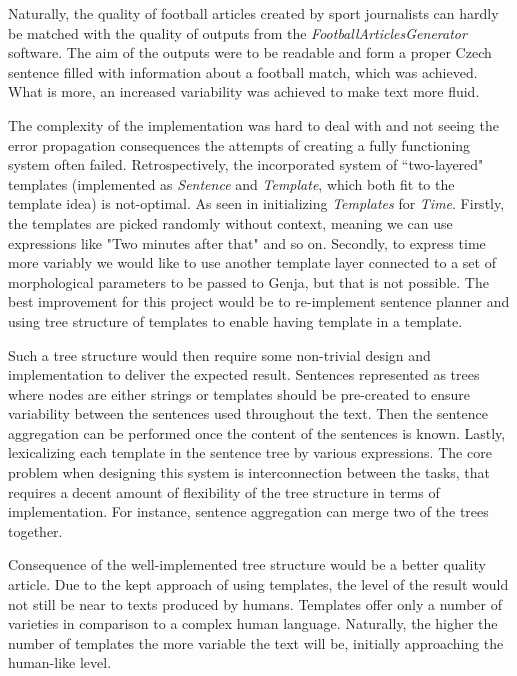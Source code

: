Naturally, the quality of football articles created by sport journalists can hardly be matched with the quality of outputs from the \textit{FootballArticlesGenerator} software. The aim of the outputs were to be readable and form a proper Czech sentence filled with information about a football match, which was achieved. What is more, an increased variability was achieved to make text more fluid.

The complexity of the implementation was hard to deal with and not seeing the error propagation consequences the attempts of creating a fully functioning system often failed. Retrospectively, the incorporated system of ``two-layered" templates (implemented as \textit{Sentence} and \textit{Template}, which both fit to the template idea) is not-optimal. As seen in initializing \textit{Templates} for \textit{Time}. Firstly, the templates are picked randomly without context, meaning we can use expressions like "Two minutes after that" and so on. Secondly, to express time more variably we would like to use another template layer connected to a set of morphological parameters to be passed to Genja, but that is not possible. The best improvement for this project would be to re-implement sentence planner and using tree structure of templates to enable having template in a template. 

Such a tree structure would then require some non-trivial design and implementation to deliver the expected result. Sentences represented as trees where nodes are either strings or templates should be pre-created  to ensure variability between the sentences used throughout the text. Then the sentence aggregation can be performed once the content of the sentences is known. Lastly, lexicalizing each template in the sentence tree by various expressions. The core problem when designing this system is interconnection between the tasks, that requires a decent amount of flexibility of the tree structure in terms of implementation. For instance, sentence aggregation can merge two of the trees together.

Consequence of the well-implemented tree structure would be a better quality article. Due to the kept approach of using templates, the level of the result would not still be near to texts produced by humans. Templates offer only a number of varieties in comparison to a complex human language. Naturally, the higher the number of templates the more variable the text will be, initially approaching the human-like level. 

